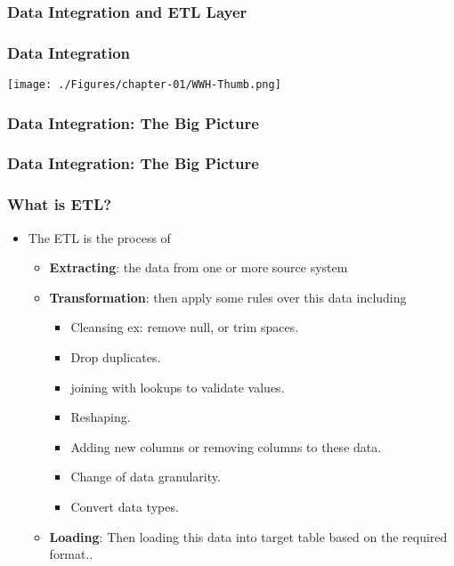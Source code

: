 \subsubsection{Data Integration and ETL Layer}

\begin{frame}
    \frametitle{Data Integration}

    \texttt{[image: ./Figures/chapter-01/WWH-Thumb.png]}

\end{frame}
\begin{frame}
    \frametitle{Data Integration: The Big Picture}

    

\end{frame}
\begin{frame}
    \frametitle{Data Integration: The Big Picture}

    

\end{frame}
\begin{frame}
    \frametitle{What is ETL?}

    \begin{itemize}[<+->]
        \item The ETL is the process of
        \begin{itemize}[<+->]
            \item  \textbf{Extracting}: the data from one or more source system
            \item  \textbf{Transformation}: then apply some rules over this data including
            \begin{itemize}[<+->]
                \item Cleansing ex: remove null, or trim spaces.
                \item Drop duplicates.
                \item joining with lookups to validate values.
                \item Reshaping.
                \item Adding new columns or removing columns to these data.
                \item Change of data granularity.
                \item Convert data types.
            \end{itemize}
            \item \textbf{Loading}: Then loading this data into target table based on the required format..
        \end{itemize}    
    \end{itemize}

\end{frame}
